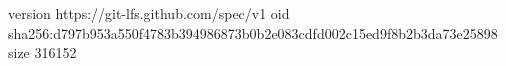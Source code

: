 version https://git-lfs.github.com/spec/v1
oid sha256:d797b953a550f4783b394986873b0b2e083cdfd002c15ed9f8b2b3da73e25898
size 316152
